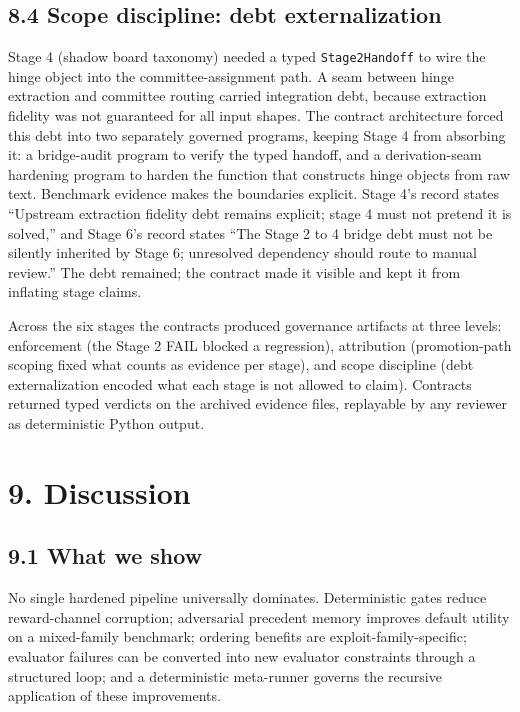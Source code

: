 \documentclass[
  11pt]{article}
\begin{document}
\subsection{8.4 Scope discipline: debt
externalization}\label{scope-discipline-debt-externalization}

Stage 4 (shadow board taxonomy) needed a typed \texttt{Stage2Handoff} to
wire the hinge object into the committee-assignment path. A seam between
hinge extraction and committee routing carried integration debt, because
extraction fidelity was not guaranteed for all input shapes. The
contract architecture forced this debt into two separately governed
programs, keeping Stage 4 from absorbing it: a bridge-audit program to
verify the typed handoff, and a derivation-seam hardening program to
harden the function that constructs hinge objects from raw text.
Benchmark evidence makes the boundaries explicit. Stage 4's record
states ``Upstream extraction fidelity debt remains explicit; stage 4
must not pretend it is solved,'' and Stage 6's record states ``The Stage
2 to 4 bridge debt must not be silently inherited by Stage 6; unresolved
dependency should route to manual review.'' The debt remained; the
contract made it visible and kept it from inflating stage claims.

Across the six stages the contracts produced governance artifacts at
three levels: enforcement (the Stage 2 FAIL blocked a regression),
attribution (promotion-path scoping fixed what counts as evidence per
stage), and scope discipline (debt externalization encoded what each
stage is not allowed to claim). Contracts returned typed verdicts on the
archived evidence files, replayable by any reviewer as deterministic
Python output.

\section{9. Discussion}\label{discussion}

\subsection{9.1 What we show}\label{what-we-show}

No single hardened pipeline universally dominates. Deterministic gates
reduce reward-channel corruption; adversarial precedent memory improves
default utility on a mixed-family benchmark; ordering benefits are
exploit-family-specific; evaluator failures can be converted into new
evaluator constraints through a structured loop; and a deterministic
meta-runner governs the recursive application of these improvements.
\end{document}
